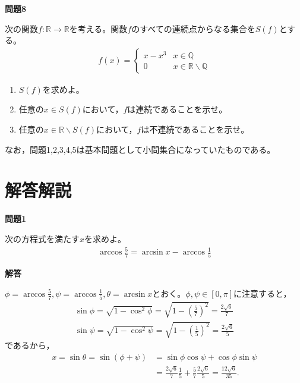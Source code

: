 \documentclass[a4paper,12pt,dvipdfmx,fleqn, oneside]{jsarticle}
\theoremstyle{defstyle}
\theoremstyle{thmx}
\theoremstyle{qesstyle}
\begin{document}
\begin{shadebox}
    \textbf{問題8}

    次の関数$f: \mathbb{R} \rightarrow \mathbb{R}$を考える。関数$f$のすべての連続点からなる集合を$S(f)$とする。
    \begin{align*}
        f(x) =
        \begin{cases}
            x-x^3 & x \in \mathbb{Q}                       \\
            0     & x \in \mathbb{R} \backslash \mathbb{Q}
        \end{cases}
    \end{align*}
    \begin{enumerate}
        \item $S(f)$を求めよ。
        \item 任意の$x \in S(f)$において，$f$は連続であることを示せ。
        \item 任意の$x \in \mathbb{R} \backslash S(f)$において，$f$は不連続であることを示せ。
    \end{enumerate}
\end{shadebox}
なお，問題1,2,3,4,5は基本問題として小問集合になっていたものである。

\section*{解答解説}
\begin{shadebox}
    \textbf{問題1}

    次の方程式を満たす$x$を求めよ。
    \begin{align*}
        \arccos \frac{5}{7} = \arcsin x- \arccos \frac{1}{5}
    \end{align*}
\end{shadebox}

\begin{screen}
    \textbf{解答}

    \text{　}$\phi = \arccos \frac{5}{7}, \psi = \arccos \frac{1}{5}, \theta = \arcsin x$とおく。$\phi , \psi \in [0, \pi]$に注意すると，
    \begin{align*}
        \sin \phi = \sqrt{1- \cos ^2 \phi }= \sqrt{1- \left(\frac{5}{7}\right)^2}=\frac{2\sqrt{6}}{7} \\
        \sin \psi = \sqrt{1- \cos ^2 \psi }= \sqrt{1-\left(\frac{1}{5}\right)^2}= \frac{2\sqrt{6}}{5}
    \end{align*}
    であるから，
    \begin{align*}
        x = \sin \theta = \sin (\phi + \psi ) & = \sin \phi \cos \psi + \cos \phi \sin \psi                                                 \\
                                              & =\frac{2\sqrt{6}}{7} \frac{1}{5} + \frac{5}{7} \frac{2\sqrt{6}}{5} = \frac{12\sqrt{6}}{35}.
    \end{align*}
\end{screen}
\end{document}
